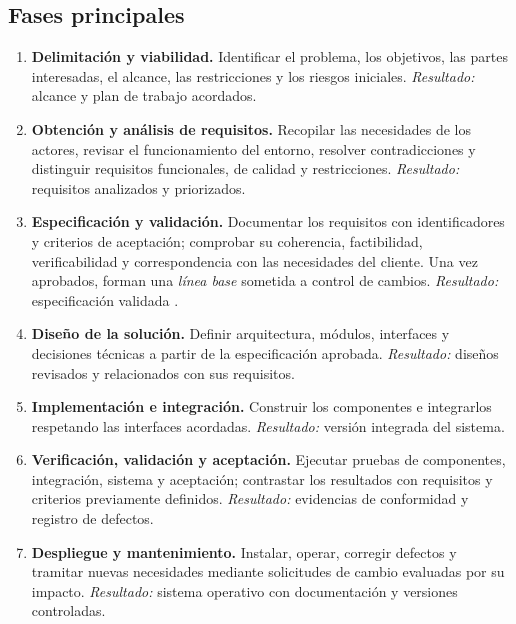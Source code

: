 \subsection{Fases principales}
\begin{enumerate}
  \item \textbf{Delimitación y viabilidad.} Identificar el problema, los
  objetivos, las partes interesadas, el alcance, las restricciones y los
  riesgos iniciales. \emph{Resultado:} alcance y plan de trabajo acordados.

  \item \textbf{Obtención y análisis de requisitos.} Recopilar las
  necesidades de los actores, revisar el funcionamiento del entorno,
  resolver contradicciones y distinguir requisitos funcionales, de calidad
  y restricciones. \emph{Resultado:} requisitos analizados y priorizados.

  \item \textbf{Especificación y validación.} Documentar los requisitos
  con identificadores y criterios de aceptación; comprobar su coherencia,
  factibilidad, verificabilidad y correspondencia con las necesidades del
  cliente. Una vez aprobados, forman una \emph{línea base} sometida a
  control de cambios. \emph{Resultado:} especificación validada
  \cite{pohl2025,ireb2026}.

  \item \textbf{Diseño de la solución.} Definir arquitectura, módulos,
  interfaces y decisiones técnicas a partir de la especificación aprobada.
  \emph{Resultado:} diseños revisados y relacionados con sus requisitos.

  \item \textbf{Implementación e integración.} Construir los componentes e
  integrarlos respetando las interfaces acordadas. \emph{Resultado:}
  versión integrada del sistema.

  \item \textbf{Verificación, validación y aceptación.} Ejecutar pruebas
  de componentes, integración, sistema y aceptación; contrastar los
  resultados con requisitos y criterios previamente definidos.
  \emph{Resultado:} evidencias de conformidad y registro de defectos.

  \item \textbf{Despliegue y mantenimiento.} Instalar, operar, corregir
  defectos y tramitar nuevas necesidades mediante solicitudes de cambio
  evaluadas por su impacto. \emph{Resultado:} sistema operativo con
  documentación y versiones controladas.
\end{enumerate}

